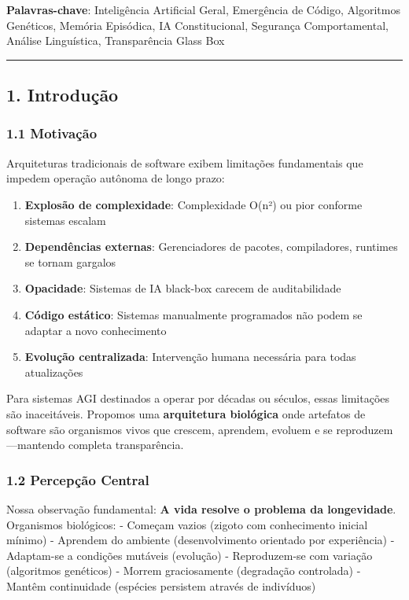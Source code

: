 \documentclass[
]{article}
\providecommand{\tightlist}{%
  \setlength{\itemsep}{0pt}\setlength{\parskip}{0pt}}
\begin{document}
\textbf{Palavras-chave}: Inteligência Artificial Geral, Emergência de
Código, Algoritmos Genéticos, Memória Episódica, IA Constitucional,
Segurança Comportamental, Análise Linguística, Transparência Glass Box

\begin{center}\rule{0.5\linewidth}{0.5pt}\end{center}

\subsection{1. Introdução}\label{introduuxe7uxe3o}

\subsubsection{1.1 Motivação}\label{motivauxe7uxe3o}

Arquiteturas tradicionais de software exibem limitações fundamentais que
impedem operação autônoma de longo prazo:

\begin{enumerate}
\def\labelenumi{\arabic{enumi}.}
\tightlist
\item
  \textbf{Explosão de complexidade}: Complexidade O(n²) ou pior conforme
  sistemas escalam
\item
  \textbf{Dependências externas}: Gerenciadores de pacotes,
  compiladores, runtimes se tornam gargalos
\item
  \textbf{Opacidade}: Sistemas de IA black-box carecem de auditabilidade
\item
  \textbf{Código estático}: Sistemas manualmente programados não podem
  se adaptar a novo conhecimento
\item
  \textbf{Evolução centralizada}: Intervenção humana necessária para
  todas atualizações
\end{enumerate}

Para sistemas AGI destinados a operar por décadas ou séculos, essas
limitações são inaceitáveis. Propomos uma \textbf{arquitetura biológica}
onde artefatos de software são organismos vivos que crescem, aprendem,
evoluem e se reproduzem---mantendo completa transparência.

\subsubsection{1.2 Percepção Central}\label{percepuxe7uxe3o-central}

Nossa observação fundamental: \textbf{A vida resolve o problema da
longevidade}. Organismos biológicos: - Começam vazios (zigoto com
conhecimento inicial mínimo) - Aprendem do ambiente (desenvolvimento
orientado por experiência) - Adaptam-se a condições mutáveis (evolução)
- Reproduzem-se com variação (algoritmos genéticos) - Morrem
graciosamente (degradação controlada) - Mantêm continuidade (espécies
persistem através de indivíduos)
\end{document}
